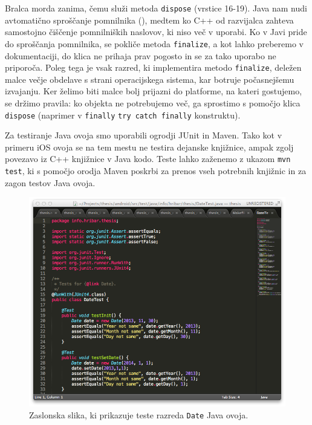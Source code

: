 Bralca morda zanima, čemu služi metoda \texttt{dispose} (vrstice 16-19). Java nam nudi avtomatično sproščanje pomnilnika (), medtem ko C++ od razvijalca zahteva samostojno čiščenje pomnilniških naslovov, ki niso več v uporabi. Ko v Javi pride do sproščanja pomnilnika, se pokliče metoda \texttt{finalize}, a kot lahko preberemo v dokumentaciji\cite{android-object}, do klica ne prihaja prav pogosto in se za tako uporabo ne priporoča. Poleg tega je vsak razred, ki implementira metodo \texttt{finalize}, deležen malce večje obdelave s strani operacijskega sistema, kar botruje počasnejšemu izvajanju. Ker želimo biti malce bolj prijazni do platforme, na kateri gostujemo, se držimo pravila: ko objekta ne potrebujemo več, ga sprostimo s pomočjo klica \texttt{dispose} (naprimer v \texttt{finally} \texttt{try catch finally} konstruktu).

Za testiranje Java ovoja smo uporabili ogrodji JUnit\cite{junit} in Maven\cite{maven}. Tako kot v primeru iOS ovoja se na tem mestu ne testira dejanske knjižnice, ampak zgolj povezavo iz C++ knjižnice v Java kodo. Teste lahko zaženemo z ukazom \texttt{mvn test}, ki s pomočjo orodja Maven poskrbi za prenos vseh potrebnih knjižnic in za zagon testov Java ovoja.

\begin{figure}
 \includegraphics[width=\linewidth]{java-tests}
 \caption{Zaslonska slika, ki prikazuje teste razreda \texttt{Date} Java ovoja.}
 \label{fig:java-tests}
\end{figure}

